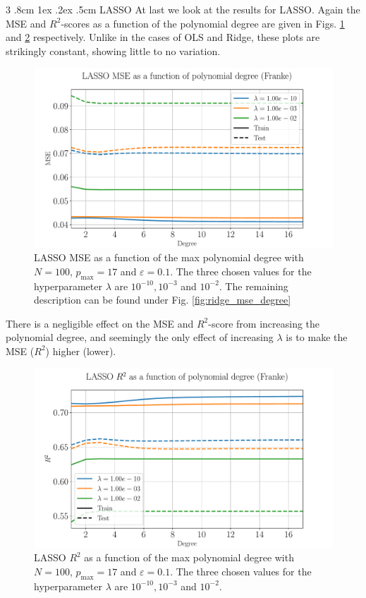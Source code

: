 \documentclass[%
reprint,
amsmath,amssymb,
aps,
pra,
]{revtex4-2}
\makeatletter
\renewcommand{\subsubsection}{%
	\@startsection
	{subsubsection}%
	{3}%
	{\z@}%
	{.8cm \@plus1ex \@minus .2ex}%
	{.5cm}%
	{\normalfont\small\centering}%
}
\makeatother
\begin{document}
\subsubsection{LASSO}
At last we look at the results for LASSO. Again the MSE and $R^2$-scores as a function of the polynomial degree are given in Figs. \ref{fig:lasso_mse_degree} and \ref{fig:lasso_r2_degree} respectively. Unlike in the cases of OLS and Ridge, these plots are strikingly constant, showing little to no variation. 
\begin{figure}[ht!]
	\centering
	\includegraphics[width=\linewidth]{Python/Figures/LASSO/LASSO_MSE_Unscaled.pdf}
	\caption{LASSO MSE as a function of the max polynomial degree with \(N=100\), \(p_{\text{max}}=17\) and \(\varepsilon=0.1\). The three chosen values for the hyperparameter $\lambda$ are $10^{-10},10^{-3}$ and $10^{-2}$. The remaining description can be found under Fig. \ref{fig:ridge_mse_degree}}
	\label{fig:lasso_mse_degree}
\end{figure}
There is a negligible effect on the MSE and \(R^2\)-score from increasing the polynomial degree, and seemingly the only effect of increasing $\lambda$ is to make the MSE ($R^2$) higher (lower). 
\begin{figure}[ht!]
	\centering
	\includegraphics[width=\linewidth]{Python/Figures/LASSO/LASSO_R2_Unscaled.pdf}
	\caption{LASSO $R^2$ as a function of the max polynomial degree with \(N=100\), \(p_{\text{max}}=17\) and \(\varepsilon=0.1\). The three chosen values for the hyperparameter $\lambda$ are $10^{-10},10^{-3}$ and $10^{-2}$.}
	\label{fig:lasso_r2_degree}
\end{figure}
\end{document}
